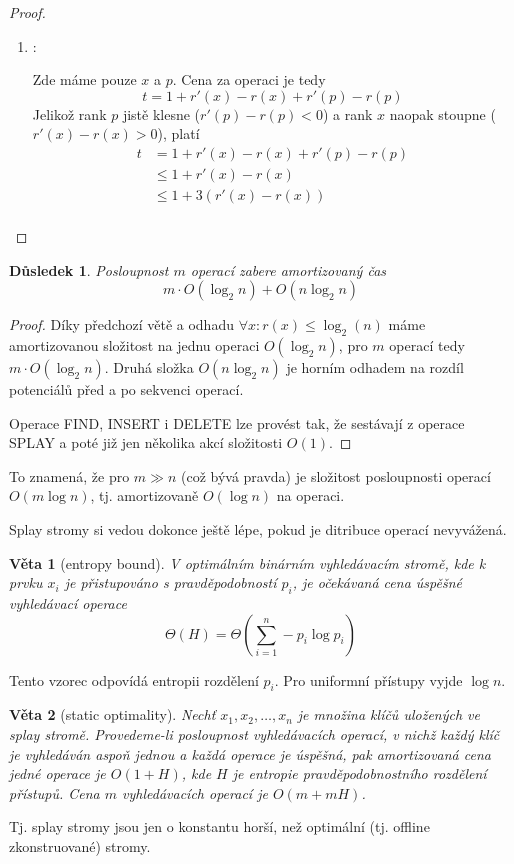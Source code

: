 \documentclass[11pt]{report} %
\newtheorem{theorem}{Věta}[section]
\newtheorem{implication}{Důsledek}[section]
\numberwithin{equation}{section}
\begin{document}
\begin{proof}
\begin{enumerate}
	
	
	\item \textbf{}:
	
	Zde máme pouze $x$ a $p$. Cena za operaci je tedy
	$$t = 1 + r'(x) - r(x) + r'(p) - r(p)$$
	Jelikož rank $p$ jistě klesne ($r'(p) - r(p) < 0$) a rank $x$ naopak stoupne ($r'(x) - r(x) > 0$), platí
	\begin{align*}
	t 	&= 1 + r'(x) - r(x) + r'(p) - r(p)\\ 
		&\leq 1 + r'(x) - r(x) \\
		&\leq 1 + 3(r'(x) - r(x))\\
	\end{align*}

	
\end{enumerate}
\end{proof}

\begin{implication}
Posloupnost $m$ operací zabere amortizovaný čas 
$$m\cdot O(\log_2n) + O(n\log_2n)$$
\end{implication}
\begin{proof}
Díky předchozí větě a odhadu $\forall x : r(x) \leq \log_2(n)$ máme amortizovanou složitost na jednu operaci $O(\log_2 n)$, pro $m$ operací tedy $m\cdot O(\log_2n)$. Druhá složka $O(n\log_2n)$ je horním odhadem na rozdíl potenciálů před a po sekvenci operací.

Operace FIND, INSERT i DELETE lze provést tak, že sestávají z operace SPLAY a poté již jen několika akcí složitosti $O(1)$.
\end{proof}

To znamená, že pro $m \gg n$ (což bývá pravda) je složitost posloupnosti operací $O(m\log n)$, tj. amortizovaně $O(\log n)$ na operaci. 

Splay stromy si vedou dokonce ještě lépe, pokud je ditribuce operací nevyvážená.	

\begin{theorem}[entropy bound]
V \textit{optimálním} binárním vyhledávacím stromě, kde k prvku $x_i$ je přistupováno s pravděpodobností $p_i$, je očekávaná cena úspěšné vyhledávací operace 
$$\Theta(H) = \Theta\left(\sum_{i=1}^{n}-p_i \log p_i \right)$$
\end{theorem}
Tento vzorec odpovídá entropii rozdělení $p_i$. Pro uniformní přístupy vyjde $\log n$.

\begin{theorem}[static optimality]
Nechť $x_1, x_2, \dots, x_n$ je množina klíčů uložených ve splay stromě. Provedeme-li posloupnost vyhledávacích operací, v nichž každý klíč je vyhledáván aspoň jednou a každá operace je úspěšná, pak amortizovaná cena jedné operace je $O(1+H)$, kde $H$ je entropie pravděpodobnostního rozdělení přístupů. Cena $m$ vyhledávacích operací je $O(m+mH)$.
\end{theorem}
Tj. splay stromy jsou jen o konstantu horší, než optimální (tj. offline zkonstruované) stromy.
\end{document}

